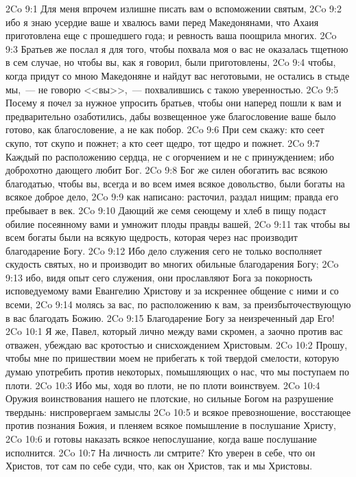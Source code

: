\vs 2Co 9:1 Для меня впрочем излишне писать вам о вспоможении святым,
\vs 2Co 9:2 ибо я знаю усердие ваше и хвалюсь вами перед Македонянами, что Ахаия приготовлена еще с прошедшего года; и ревность ваша поощрила многих.
\vs 2Co 9:3 Братьев же послал я для того, чтобы похвала моя о вас не оказалась тщетною в сем случае, но чтобы вы, как я говорил, были приготовлены,
\vs 2Co 9:4  чтобы, когда придут со мною Македоняне и найдут вас неготовыми, не остались в стыде мы,~--- не говорю <<вы>>,~--- похвалившись с такою уверенностью.
\vs 2Co 9:5 Посему я почел за нужное упросить братьев, чтобы они наперед пошли к вам и предварительно озаботились, дабы возвещенное уже благословение ваше было готово, как благословение, а не как побор.
\rsbpar\vs 2Co 9:6 При сем скажу: кто сеет скупо, тот скупо и пожнет; а кто сеет щедро, тот щедро и пожнет.
\vs 2Co 9:7 Каждый  по расположению сердца, не с огорчением и не с принуждением; ибо доброхотно дающего любит Бог.
\vs 2Co 9:8 Бог же силен обогатить вас всякою благодатью, чтобы вы, всегда и во всем имея всякое довольство, были богаты на всякое доброе дело,
\vs 2Co 9:9 как написано: расточил, раздал нищим; правда его пребывает в век.
\vs 2Co 9:10 Дающий же семя сеющему и хлеб в пищу подаст обилие посеянному вами и умножит плоды правды вашей,
\vs 2Co 9:11 так чтобы вы всем богаты были на всякую щедрость, которая через нас производит благодарение Богу.
\vs 2Co 9:12 Ибо дело служения сего не только восполняет скудость святых, но и производит во многих обильные благодарения Богу;
\vs 2Co 9:13 ибо, видя опыт сего служения, они прославляют Бога за покорность исповедуемому вами Евангелию Христову и за искреннее общение с ними и со всеми,
\vs 2Co 9:14 молясь за вас, по расположению к вам, за преизбыточествующую в вас благодать Божию.
\vs 2Co 9:15 Благодарение Богу за неизреченный дар Его!
\vs 2Co 10:1 Я же, Павел, который лично между вами скромен, а заочно против вас отважен, убеждаю вас кротостью и снисхождением Христовым.
\vs 2Co 10:2 Прошу, чтобы мне по пришествии моем не прибегать к той твердой смелости, которую думаю употребить против некоторых, помышляющих о нас, что мы поступаем по плоти.
\vs 2Co 10:3 Ибо мы, ходя во плоти, не по плоти воинствуем.
\vs 2Co 10:4 Оружия воинствования нашего не плотские, но сильные Богом на разрушение твердынь:  ниспровергаем замыслы
\vs 2Co 10:5 и всякое превозношение, восстающее против познания Божия, и пленяем всякое помышление в послушание Христу,
\vs 2Co 10:6 и готовы наказать всякое непослушание, когда ваше послушание исполнится.
\vs 2Co 10:7 На личность ли смтрите? Кто уверен в себе, что он Христов, тот сам по себе суди, что, как он Христов, так и мы Христовы.
